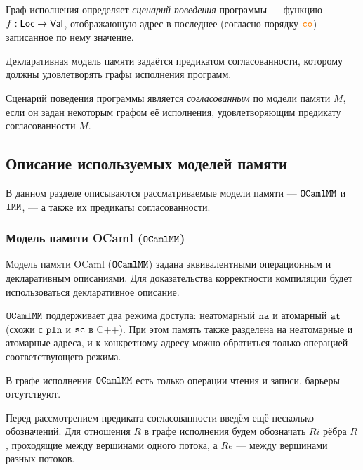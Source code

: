 \begin{defn}\label{def:outcome}
  \label{definition:outcome-def}
  Граф исполнения определяет \emph{сценарий поведения} программы --- функцию ${f: \mathsf{Loc} \to \mathsf{Val}}$, отображающую адрес в последнее (согласно порядку $\lCO$) записанное по нему значение. 
\end{defn}

Декларативная модель памяти задаётся предикатом согласованности, которому должны удовлетворять графы исполнения программ.
\begin{defn}\label{def:outcome}
  Сценарий поведения программы является \emph{согласованным} по модели памяти $M$, если он задан некоторым графом её исполнения, удовлетворяющим предикату согласованности $M$.
\end{defn}  

\subsection{Описание используемых моделей памяти}
\label{mm-description}

В данном разделе описываются рассматриваемые модели памяти ---  $\mathtt{OCaml}\allowbreak \mathtt{MM}$ и $\mathtt{IMM}$, --- а также их предикаты
согласованности.

\subsubsection{Модель памяти OCaml ($\mathtt{OCaml}\allowbreak \mathtt{MM}$)}
\label{ocaml-mm}

Модель памяти OCaml ($\mathtt{OCaml}\allowbreak \mathtt{MM}$) \cite{omm} задана эквивалентными операционным и декларативным описаниями. Для доказательства корректности компиляции будет использоваться декларативное описание.

$\mathtt{OCaml}\allowbreak \mathtt{MM}$ поддерживает два режима доступа: неатомарный ${\mathtt{na}}$ и атомарный ${\mathtt{at}}$ (схожи с $\mathtt{pln}$ и ${\mathtt{sc}}$ в C++). При этом память также разделена на неатомарные и атомарные адреса, и к конкретному адресу можно обратиться только операцией соответствующего режима.

В графе исполнения $\mathtt{OCaml}\allowbreak \mathtt{MM}$ есть только операции чтения и записи, барьеры отсутствуют.

Перед рассмотрением предиката согласованности введём ещё несколько обозначений. Для отношения $R$ в графе исполнения будем обозначать $Ri$ рёбра $R$, проходящие между вершинами одного потока, а $Re$ --- между вершинами разных потоков. 

